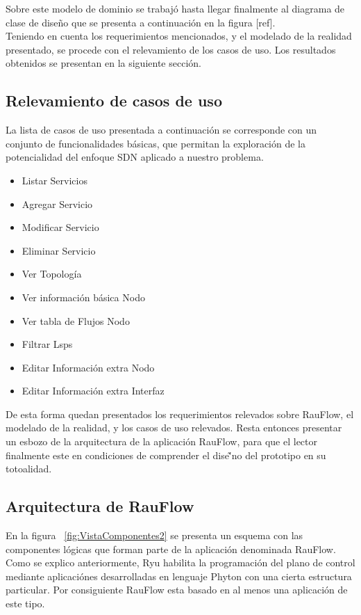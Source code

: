Sobre este modelo de dominio se trabaj\'o hasta llegar finalmente al diagrama de clase de dise\~no que se presenta a continuaci\'on en la figura [ref].\\

Teniendo en cuenta los requerimientos mencionados, y el modelado de la realidad presentado, se procede con el relevamiento de los casos de uso. Los resultados obtenidos se presentan en la siguiente secci\'on.

\subsection[Relevamiento de casos de uso]{Relevamiento de casos de uso}

La lista de casos de uso presentada a continuaci\'on se corresponde con un conjunto de funcionalidades b\'asicas, que permitan la exploraci\'on de la potencialidad del enfoque SDN aplicado a nuestro problema. 

\begin{itemize}
\item Listar Servicios
\item Agregar Servicio
\item Modificar Servicio
\item Eliminar Servicio
\item Ver Topolog\'ia
\item Ver informaci\'on b\'asica Nodo
\item Ver tabla de Flujos Nodo
\item Filtrar Lsps
\item Editar Informaci\'on extra Nodo
\item Editar Informaci\'on extra Interfaz
\end{itemize}

De esta forma quedan presentados los requerimientos relevados sobre RauFlow, el modelado de la realidad, y los casos de uso relevados. Resta entonces presentar un esbozo de la arquitectura de la aplicaci\'on RauFlow, para que el lector finalmente este en condiciones de comprender el dise\~'no del prototipo en su totoalidad.

\subsection[Arquitectura de RauFlow]{Arquitectura de RauFlow}

En la figura ~\ref{fig:VistaComponentes2} se presenta un esquema con las componentes l\'ogicas que forman parte de la aplicaci\'on denominada RauFlow. Como se explico anteriormente, Ryu habilita la programaci\'on del plano de control mediante aplicaci\'ones desarrolladas en lenguaje Phyton con una cierta estructura particular. Por consiguiente RauFlow esta basado en al menos una aplicaci\'on de este tipo.\\

